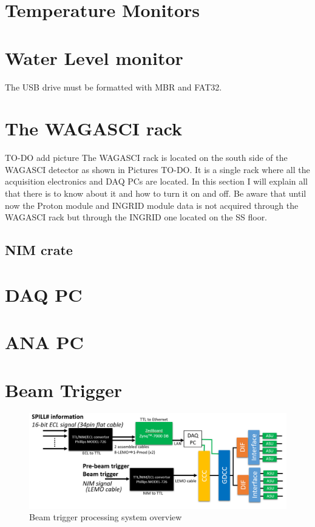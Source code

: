 \section{Temperature Monitors}
\section{Water Level monitor}
The USB drive must be formatted with MBR and FAT32.
\section{The WAGASCI rack}
TO-DO add picture
The WAGASCI rack is located on the south side of the WAGASCI detector as shown
in Pictures TO-DO. It is a single rack where all the acquisition electronics and
DAQ PCs are located. In this section I will explain all that there is to know
about it and how to turn it on and off. Be aware that until now the Proton
module and INGRID module data is not acquired through the WAGASCI rack but
through the INGRID one located on the SS floor.
\subsection{NIM crate}

\section{DAQ PC}

\section{ANA PC}

\section{Beam Trigger}
\begin{figure}[ht]
  \centering \includegraphics[width=\linewidth]{beam-trigger}
  \caption{Beam trigger processing system overview}\label{fig:beam-trigger}
\end{figure}
